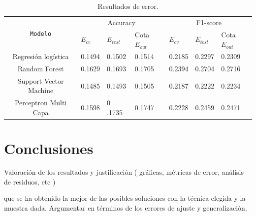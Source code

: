 \documentclass[11pt,a4paper]{article}
\begin{document}
\begin{table}[h]
  \begin{center}

\begin{tabular}{|c| lll| lll|}
\hline
  \multirow{2}{*}{\texttt{Modelo}} &     \multicolumn{3}{c|}{Accuracy}  &      \multicolumn{3}{c|}{F1-score} \\
          & $E_{cv}$&$E_{test}$& Cota $E_{out}$ &$E_{cv}$&$E_{test}$& Cota $E_{out}$ \\
\hline

  Regresión logística & 0.1494 & 0.1502 & 0.1514 & 0.2185 & 0.2297 & 0.2309 \\
  Random Forest & 0.1629 & 0.1693 & 0.1705 & 0.2394 & 0.2704 &0.2716 \\
  Support Vector Machine & 0.1485 & 0.1493 & 0.1505 & 0.2187 & 0.2222 & 0.2234 \\
  Perceptron Multi Capa & 0.1598 & 0 .1735 &0.1747 & 0.2228 & 0.2459 &0.2471  \\\hline

\end{tabular}
\end{center}
\caption{Resultados de error.}
\label{tab:table-name-error} 
\end{table}



\newpage
\section{ Conclusiones }
Valoración de los resultados y justificación
( gráficas, métricas de error, análisis de residuos, etc )


que se ha obtenido la mejor de las posibles soluciones con la técnica elegida y la muestra dada. Argumentar en términos de los errores de ajuste y generalización. 
\end{document}
